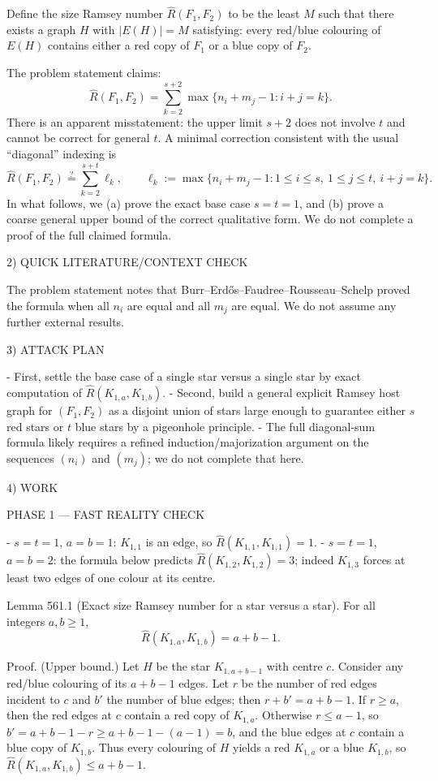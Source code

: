 Define the size Ramsey number $\hat R(F_1,F_2)$ to be the least $M$ such that there exists a graph $H$ with $|E(H)|=M$ satisfying: every red/blue colouring of $E(H)$ contains either a red copy of $F_1$ or a blue copy of $F_2$.

The problem statement claims:
\[
\hat{R}(F_1,F_2)=\sum_{k=2}^{s+2} \max\{n_i+m_j-1: i+j=k\}.
\]
There is an apparent misstatement: the upper limit $s+2$ does not involve $t$ and cannot be correct for general $t$.
A minimal correction consistent with the usual ``diagonal'' indexing is
\[
\hat{R}(F_1,F_2)\stackrel{?}{=}\sum_{k=2}^{s+t} \ell_k,\qquad
\ell_k:= \max\{n_i+m_j-1: 1\le i\le s,\ 1\le j\le t,\ i+j=k\}.
\]
In what follows, we (a) prove the exact base case $s=t=1$, and (b) prove a coarse general upper bound of the correct qualitative form.
We do not complete a proof of the full claimed formula.

2) QUICK LITERATURE/CONTEXT CHECK

The problem statement notes that Burr--Erd\H{o}s--Faudree--Rousseau--Schelp proved the formula when all $n_i$ are equal and all $m_j$ are equal.
We do not assume any further external results.

3) ATTACK PLAN

- First, settle the base case of a single star versus a single star by exact computation of $\hat R(K_{1,a},K_{1,b})$.
- Second, build a general explicit Ramsey host graph for $(F_1,F_2)$ as a disjoint union of stars large enough to guarantee either $s$ red stars or $t$ blue stars by a pigeonhole principle.
- The full diagonal-sum formula likely requires a refined induction/majorization argument on the sequences $(n_i)$ and $(m_j)$; we do not complete that here.

4) WORK

PHASE 1 — FAST REALITY CHECK

- $s=t=1$, $a=b=1$: $K_{1,1}$ is an edge, so $\hat R(K_{1,1},K_{1,1})=1$.
- $s=t=1$, $a=b=2$: the formula below predicts $\hat R(K_{1,2},K_{1,2})=3$; indeed $K_{1,3}$ forces at least two edges of one colour at its centre.

Lemma 561.1 (Exact size Ramsey number for a star versus a star).
For all integers $a,b\ge 1$,
\[
\hat{R}(K_{1,a},K_{1,b})=a+b-1.
\]

Proof.
(Upper bound.) Let $H$ be the star $K_{1,a+b-1}$ with centre $c$.
Consider any red/blue colouring of its $a+b-1$ edges.
Let $r$ be the number of red edges incident to $c$ and $b'$ the number of blue edges; then $r+b'=a+b-1$.
If $r\ge a$, then the red edges at $c$ contain a red copy of $K_{1,a}$.
Otherwise $r\le a-1$, so $b'=a+b-1-r\ge a+b-1-(a-1)=b$, and the blue edges at $c$ contain a blue copy of $K_{1,b}$.
Thus every colouring of $H$ yields a red $K_{1,a}$ or a blue $K_{1,b}$, so $\hat{R}(K_{1,a},K_{1,b})\le a+b-1$.

